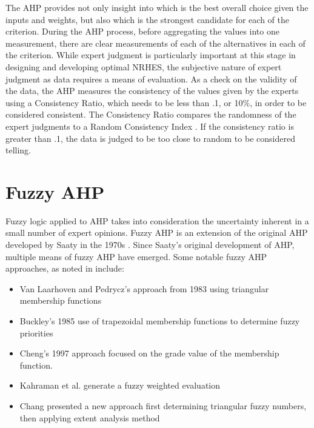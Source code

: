 \documentclass[12pt]{UIdahoMastersThesis}
\begin{document}
%

The AHP provides not only insight into which is the best overall choice given the inputs and weights, but also which is the strongest candidate for each of the criterion. During the AHP process, before aggregating the values into one measurement, there are clear measurements of each of the alternatives in each of the criterion. While expert judgment is particularly important at this stage in designing and developing optimal NRHES, the subjective nature of expert judgment as data requires a means of evaluation. As a check on the validity of the data, the AHP measures the consistency of the values given by the experts using a Consistency Ratio, which needs to be less than .1, or 10\%, in order to be considered consistent. The Consistency Ratio compares the randomness of the expert judgments to a Random Consistency Index \cite{Saaty1987}.  If the consistency ratio is greater than .1, the data is judged to be too close to random to be considered telling.


\section{Fuzzy AHP}
Fuzzy logic applied to AHP takes into consideration the uncertainty inherent in a small number of expert opinions. Fuzzy AHP is an extension of the original AHP developed by Saaty in the 1970s \cite{Saaty1987}. Since Saaty's original development of AHP, multiple means of fuzzy AHP have emerged. Some notable fuzzy AHP approaches, as noted in \cite{Kahraman2010} include:
\begin{itemize}
\item Van Laarhoven and Pedrycz's approach from 1983 using triangular membership functions
\item Buckley's 1985 use of trapezoidal membership functions to determine fuzzy priorities
\item Cheng's 1997 approach focused on the grade value of the membership function.
\item Kahraman et al. generate a fuzzy weighted evaluation \cite{Kahraman2010}
\item Chang presented a new approach first determining triangular fuzzy numbers, then applying extent analysis method \cite{Chang1996}
\end{itemize}
\end{document}
